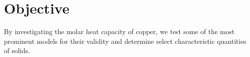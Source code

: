 \section{Objective}
\label{sec:objective}

By investigating the molar heat capacity of copper, we test some of the most prominent models for their validity and
determine select characteristic quantities of solids.

